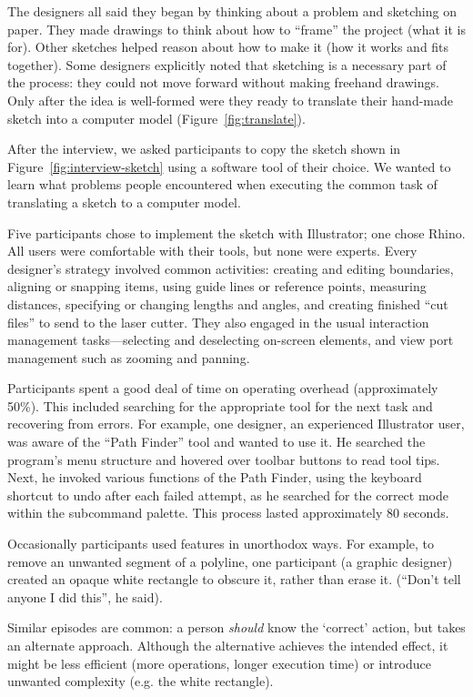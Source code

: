 The designers all said they began by thinking about a problem and
sketching on paper. They made drawings to think about how to ``frame''
the project (what it is for). Other sketches helped reason about how
to make it (how it works and fits together). Some designers explicitly
noted that sketching is a necessary part of the process: they could
not move forward without making freehand drawings. Only after the idea
is well-formed were they ready to translate their hand-made sketch
into a computer model (Figure~\ref{fig:translate}).

After the interview, we asked participants to copy the sketch shown in
Figure~\ref{fig:interview-sketch} using a software tool of their
choice. We wanted to learn what problems people encountered when
executing the common task of translating a sketch to a computer model.



Five participants chose to implement the sketch with Illustrator; one
chose Rhino. All users were comfortable with their tools, but none
were experts. Every designer's strategy involved common activities:
creating and editing boundaries, aligning or snapping items, using
guide lines or reference points, measuring distances, specifying or
changing lengths and angles, and creating finished ``cut files'' to
send to the laser cutter.  They also engaged in the usual interaction
management tasks---selecting and deselecting on-screen elements, and
view port management such as zooming and panning.

Participants spent a good deal of time on operating overhead
(approximately 50\%). This included searching for the appropriate tool
for the next task and recovering from errors. For example, one
designer, an experienced Illustrator user, was aware of the ``Path
Finder'' tool and wanted to use it. He searched the program's menu
structure and hovered over toolbar buttons to read tool tips. Next, he
invoked various functions of the Path Finder, using the keyboard
shortcut to undo after each failed attempt, as he searched for the
correct mode within the subcommand palette. This process lasted
approximately 80 seconds.

Occasionally participants used features in unorthodox ways. For
example, to remove an unwanted segment of a polyline, one participant
(a graphic designer) created an opaque white rectangle to obscure it,
rather than erase it. (``Don't tell anyone I did this'', he said).

Similar episodes are common: a person \textit{should} know the
`correct' action, but takes an alternate approach. Although the
alternative achieves the intended effect, it might be less efficient
(more operations, longer execution time) or introduce unwanted
complexity (e.g. the white rectangle).

